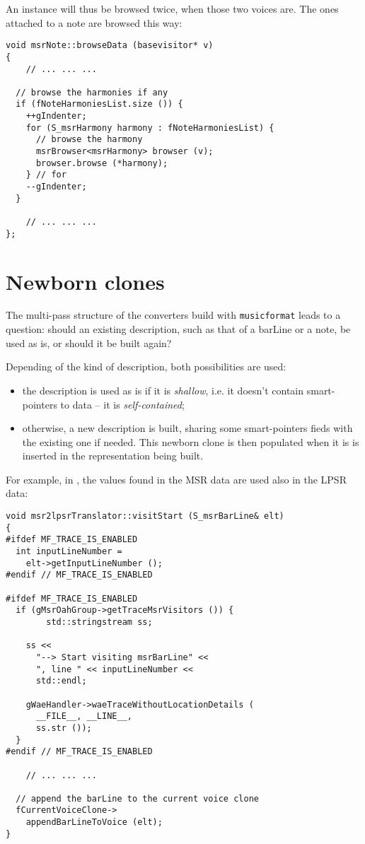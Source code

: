 An  instance will thus be browsed twice, when those two voices are. The ones attached to a note are browsed this way:
\begin{lstlisting}[language=CPlusPlus]
void msrNote::browseData (basevisitor* v)
{
	// ... ... ...

  // browse the harmonies if any
  if (fNoteHarmoniesList.size ()) {
    ++gIndenter;
    for (S_msrHarmony harmony : fNoteHarmoniesList) {
      // browse the harmony
      msrBrowser<msrHarmony> browser (v);
      browser.browse (*harmony);
    } // for
    --gIndenter;
  }

	// ... ... ...
};
\end{lstlisting}


\section{Newborn clones}

The multi-pass structure of the converters build with {\tt musicformat} leads to a question: should an existing description, such as that of a barLine or a note, be used as is, or should it be built again?

Depending of the kind of description, both possibilities are used:
\begin{itemize}
\item the description is used as is if it is {\it shallow}, i.e. it doesn't contain smart-pointers to data -- it is {\it self-contained};
\item otherwise, a new description is built, sharing some smart-pointers fieds with the existing one if needed. This newborn clone is then populated when it is is inserted in the representation being built.
\end{itemize}

For example, in \msrToLpsr{}, the  values found in the MSR data are used also in the LPSR data:
\begin{lstlisting}[language=CPlusPlus]
void msr2lpsrTranslator::visitStart (S_msrBarLine& elt)
{
#ifdef MF_TRACE_IS_ENABLED
  int inputLineNumber =
    elt->getInputLineNumber ();
#endif // MF_TRACE_IS_ENABLED

#ifdef MF_TRACE_IS_ENABLED
  if (gMsrOahGroup->getTraceMsrVisitors ()) {
		std::stringstream ss;

    ss <<
      "--> Start visiting msrBarLine" <<
      ", line " << inputLineNumber <<
      std::endl;

    gWaeHandler->waeTraceWithoutLocationDetails (
      __FILE__, __LINE__,
      ss.str ());
  }
#endif // MF_TRACE_IS_ENABLED

	// ... ... ...

  // append the barLine to the current voice clone
  fCurrentVoiceClone->
    appendBarLineToVoice (elt);
}
\end{lstlisting}

